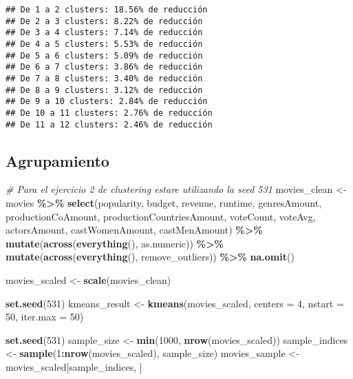 \documentclass[
]{article}
\newenvironment{Shaded}{\begin{snugshade}}{\end{snugshade}}
\newcommand{\AttributeTok}[1]{\textcolor[rgb]{0.13,0.29,0.53}{#1}}
\newcommand{\CommentTok}[1]{\textcolor[rgb]{0.56,0.35,0.01}{\textit{#1}}}
\newcommand{\DecValTok}[1]{\textcolor[rgb]{0.00,0.00,0.81}{#1}}
\newcommand{\FunctionTok}[1]{\textcolor[rgb]{0.13,0.29,0.53}{\textbf{#1}}}
\newcommand{\NormalTok}[1]{#1}
\newcommand{\OtherTok}[1]{\textcolor[rgb]{0.56,0.35,0.01}{#1}}
\newcommand{\SpecialCharTok}[1]{\textcolor[rgb]{0.81,0.36,0.00}{\textbf{#1}}}
\begin{document}
\begin{verbatim}
## De 1 a 2 clusters: 18.56% de reducción
## De 2 a 3 clusters: 8.22% de reducción
## De 3 a 4 clusters: 7.14% de reducción
## De 4 a 5 clusters: 5.53% de reducción
## De 5 a 6 clusters: 5.09% de reducción
## De 6 a 7 clusters: 3.86% de reducción
## De 7 a 8 clusters: 3.40% de reducción
## De 8 a 9 clusters: 3.12% de reducción
## De 9 a 10 clusters: 2.84% de reducción
## De 10 a 11 clusters: 2.76% de reducción
## De 11 a 12 clusters: 2.46% de reducción
\end{verbatim}

\subsection{Agrupamiento}\label{agrupamiento}

\begin{Shaded}
\begin{Highlighting}[]
\CommentTok{\# Para el ejercicio 2 de clustering estare utilizando la seed 531}
\NormalTok{movies\_clean }\OtherTok{\textless{}{-}}\NormalTok{ movies }\SpecialCharTok{\%\textgreater{}\%}
  \FunctionTok{select}\NormalTok{(popularity, budget, revenue, runtime, }
\NormalTok{         genresAmount, productionCoAmount, }
\NormalTok{         productionCountriesAmount, voteCount, }
\NormalTok{         voteAvg, actorsAmount, }
\NormalTok{         castWomenAmount, castMenAmount) }\SpecialCharTok{\%\textgreater{}\%}
  \FunctionTok{mutate}\NormalTok{(}\FunctionTok{across}\NormalTok{(}\FunctionTok{everything}\NormalTok{(), as.numeric)) }\SpecialCharTok{\%\textgreater{}\%}
  \FunctionTok{mutate}\NormalTok{(}\FunctionTok{across}\NormalTok{(}\FunctionTok{everything}\NormalTok{(), remove\_outliers)) }\SpecialCharTok{\%\textgreater{}\%}
  \FunctionTok{na.omit}\NormalTok{()}

\NormalTok{movies\_scaled }\OtherTok{\textless{}{-}} \FunctionTok{scale}\NormalTok{(movies\_clean)}

\FunctionTok{set.seed}\NormalTok{(}\DecValTok{531}\NormalTok{)}
\NormalTok{kmeans\_result }\OtherTok{\textless{}{-}} \FunctionTok{kmeans}\NormalTok{(movies\_scaled, }
                       \AttributeTok{centers =} \DecValTok{4}\NormalTok{, }
                       \AttributeTok{nstart =} \DecValTok{50}\NormalTok{,}
                       \AttributeTok{iter.max =} \DecValTok{50}\NormalTok{)}

\FunctionTok{set.seed}\NormalTok{(}\DecValTok{531}\NormalTok{)}
\NormalTok{sample\_size }\OtherTok{\textless{}{-}} \FunctionTok{min}\NormalTok{(}\DecValTok{1000}\NormalTok{, }\FunctionTok{nrow}\NormalTok{(movies\_scaled))}
\NormalTok{sample\_indices }\OtherTok{\textless{}{-}} \FunctionTok{sample}\NormalTok{(}\DecValTok{1}\SpecialCharTok{:}\FunctionTok{nrow}\NormalTok{(movies\_scaled), sample\_size)}
\NormalTok{movies\_sample }\OtherTok{\textless{}{-}}\NormalTok{ movies\_scaled[sample\_indices, ]}


\end{Highlighting}
\end{Shaded}
\end{document}
